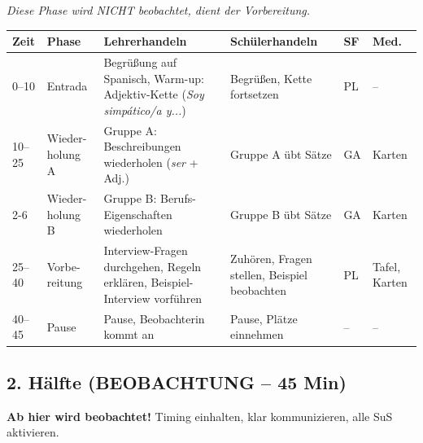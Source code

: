 \documentclass[11pt, a4paper]{article}
\newcommand{\es}[1]{\textcolor{spanisch}{\textit{#1}}}
\begin{document}
\textit{Diese Phase wird NICHT beobachtet, dient der Vorbereitung.}

\begin{longtable}{|p{1.2cm}|p{2cm}|p{4cm}|p{3.5cm}|p{1.5cm}|p{1.5cm}|}
    \hline
    \textbf{Zeit} & \textbf{Phase} & \textbf{Lehrerhandeln} & \textbf{Schülerhandeln} & \textbf{SF} & \textbf{Med.} \\
    \hline
    \endfirsthead

    0--10 & Entrada & Begrüßung auf Spanisch, Warm-up: Adjektiv-Kette (\es{Soy simpático/a y...}) & Begrüßen, Kette fortsetzen & PL & -- \\
    \hline

    10--25 & Wieder-holung A & Gruppe A: Beschreibungen wiederholen (\es{ser} + Adj.) & Gruppe A übt Sätze & GA & Karten \\
    \cline{2-6}
     & Wieder-holung B & Gruppe B: Berufs-Eigenschaften wiederholen & Gruppe B übt Sätze & GA & Karten \\
    \hline

    25--40 & Vorbe-reitung & Interview-Fragen durchgehen, Regeln erklären, Beispiel-Interview vorführen & Zuhören, Fragen stellen, Beispiel beobachten & PL & Tafel, Karten \\
    \hline

    40--45 & Pause & Pause, Beobachterin kommt an & Pause, Plätze einnehmen & -- & -- \\
    \hline
\end{longtable}

\newpage

\subsection{2. Hälfte (BEOBACHTUNG -- 45 Min)}

\begin{beobachtungsbox}
\textbf{Ab hier wird beobachtet!} Timing einhalten, klar kommunizieren, alle SuS aktivieren.
\end{beobachtungsbox}

\vspace{0.5cm}
\end{document}
